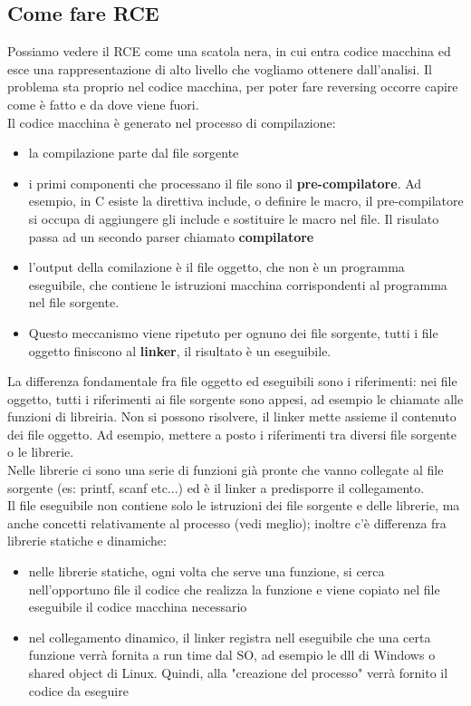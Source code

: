 \documentclass[12pt, oneside]{extbook}
\begin{document}
\subsection{Come fare RCE}
Possiamo vedere il RCE come una scatola nera, in cui entra codice macchina ed esce una rappresentazione di alto livello che vogliamo ottenere dall'analisi. Il problema sta proprio nel codice macchina, per poter fare reversing occorre capire come è fatto e da dove viene fuori.\\ Il codice macchina è generato nel processo di compilazione:
\begin{itemize}
\item la compilazione parte dal file sorgente
\item i primi componenti che processano il file sono il \textbf{pre-compilatore}. Ad esempio, in C esiste la direttiva \textsf{include}, o definire le macro, il pre-compilatore si occupa di aggiungere gli include e sostituire le macro nel file. Il risulato passa ad un secondo parser chiamato \textbf{compilatore}
\item l'output della comilazione è il file oggetto, che non è un programma eseguibile, che contiene le istruzioni macchina corrispondenti al programma nel file sorgente. 
\item Questo meccanismo viene ripetuto per ognuno dei file sorgente, tutti i file oggetto finiscono al \textbf{linker}, il risultato è un eseguibile.
\end{itemize}
La differenza fondamentale fra file oggetto ed eseguibili sono i riferimenti: nei file oggetto, tutti i riferimenti ai file sorgente sono appesi, ad esempio le chiamate alle funzioni di libreiria. Non si possono risolvere, il linker mette assieme il contenuto dei file oggetto. Ad esempio, mettere a posto i riferimenti tra diversi file sorgente o le librerie.\\ Nelle librerie ci sono una serie di funzioni già pronte che vanno collegate al file sorgente (es: printf, scanf etc...) ed è il linker a predisporre il collegamento.\\ Il file eseguibile non contiene solo le istruzioni dei file sorgente e delle librerie, ma anche concetti relativamente al processo (vedi meglio); inoltre c'è differenza fra librerie statiche e dinamiche:
\begin{itemize}
\item nelle librerie statiche, ogni volta che serve una funzione, si cerca nell'opportuno file il codice che realizza la funzione e viene copiato nel file eseguibile il codice macchina necessario
\item nel collegamento dinamico, il linker registra nell eseguibile che una certa funzione verrà fornita a run time dal SO, ad esempio le dll di Windows o shared object di Linux. Quindi, alla "creazione del processo" verrà fornito il codice da eseguire
\end{itemize}
\end{document}
